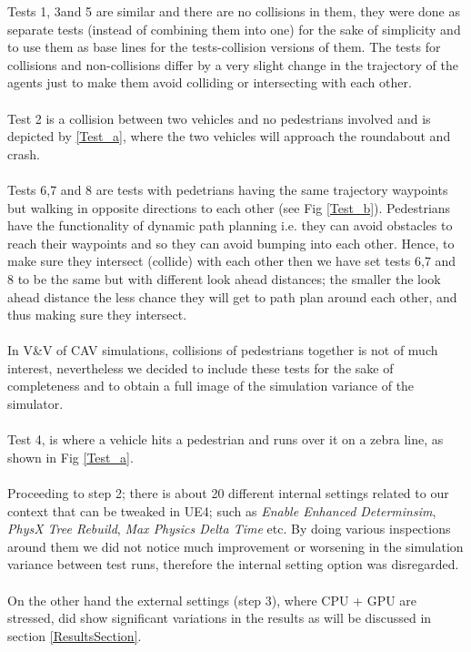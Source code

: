 \noindent Tests 1, 3and 5 are similar and there are no collisions in them, they were done as separate tests (instead of combining them into one) for the sake of simplicity and to use them as base lines for the tests-collision versions of them. The tests for collisions and non-collisions differ by a very slight change in the trajectory of the agents just to make them avoid colliding or intersecting with each other. \\\\ 
Test 2 is a collision between two vehicles and no pedestrians involved and is depicted by \ref{Test_a}, where the two vehicles will approach the roundabout and crash.\\\\
Tests 6,7 and 8 are tests with pedetrians having the same trajectory waypoints but walking in opposite directions to each other (see Fig \ref{Test_b}). 
Pedestrians have the functionality of dynamic path planning i.e. they can avoid obstacles to reach their waypoints and so they can avoid bumping into each other. 
Hence, to make sure they intersect (collide) with each other then we  have set tests 6,7 and 8 to be the same but with different look ahead distances; the smaller the look ahead distance the less chance they will get to path plan around each other, and thus making sure they intersect.\\\\ 
In V\&V of CAV simulations, collisions of pedestrians together is not of much interest, nevertheless we decided to include these tests for the sake of completeness and to obtain a full image of the simulation variance of the simulator.\\\\
Test 4, is where a vehicle hits a pedestrian and runs over it on a zebra line, as shown in Fig \ref{Test_a}.\\\\
Proceeding to step 2; there is about 20 different internal settings related to our context that can be tweaked in UE4; such as \textit{Enable Enhanced Determinsim}, \textit{PhysX Tree Rebuild}, \textit{Max Physics Delta Time} etc. By doing various inspections around them we did not notice much improvement or worsening in the simulation variance between test runs, therefore the internal setting option was disregarded.\\\\ 
On the other hand the external settings (step 3), where CPU + GPU are stressed, did show significant variations in the results as will be discussed in section \ref{ResultsSection}.
